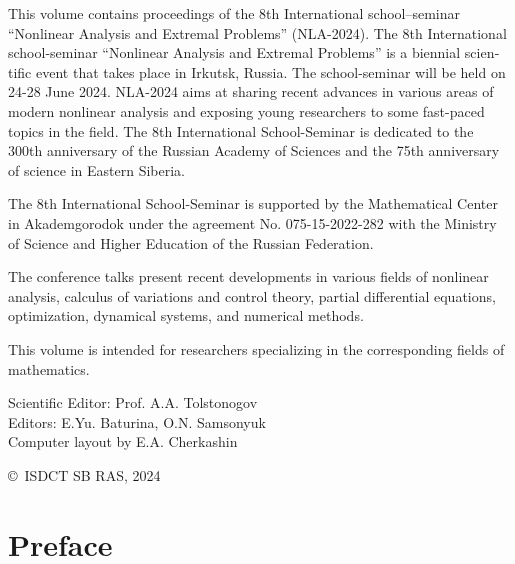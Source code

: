 \documentclass[12pt,final]{llncs}
\begin{document}
 \begin{english}
   This volume contains proceedings of the 8th International school--seminar ``Nonlinear Analysis and Extremal Problems'' (NLA-2024).
   The 8th International school-seminar ``Nonlinear Analysis and Extremal Problems'' is a biennial scientific event that takes place in Irkutsk, Russia. The school-seminar  will be held on 24-28 June 2024. NLA-2024 aims at sharing recent advances in various areas of modern nonlinear analysis and exposing young researchers to some fast-paced topics in the field. The 8th International School-Seminar is dedicated to the 300th anniversary of the Russian Academy of Sciences and the 75th anniversary of science in Eastern Siberia.

   The 8th International School-Seminar is supported by the Mathematical Center in Akademgorodok under the agreement No. 075-15-2022-282 with the Ministry of Science and Higher Education of the Russian Federation.

   The conference talks present recent developments in
   various fields of nonlinear analysis, calculus of variations and control theory,  partial differential equations, optimization, dynamical systems,
   and  numerical methods.

   This volume is intended for researchers specializing in the corresponding fields of  ma\-the\-ma\-tics.
 \end{english}
  \vspace{1cm}



 \vfill

  \vfill

 Scientific Editor: Prof. A.\;A. Tolstonogov\\[0.3em]

 Editors: E.\;Yu. Baturina, O.\;N. Samsonyuk\\[0.3em]

 Computer layout by E.\;A. Cherkashin

 \vfill



 \begin{flushright}
 \copyright\ ISDCT SB RAS, 2024
\end{flushright}


\chapter*{Preface}
%
\end{document}
